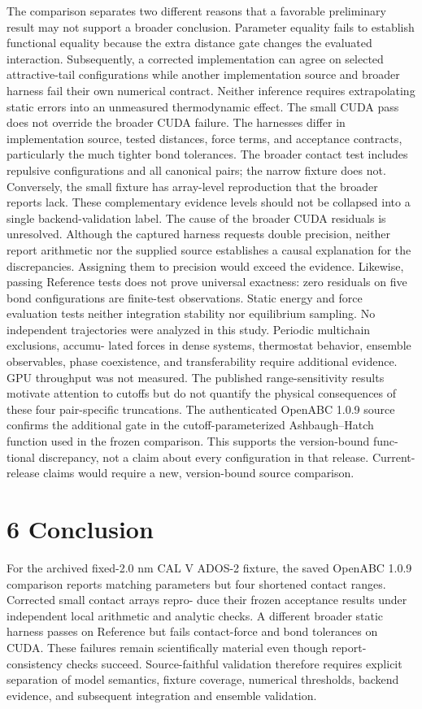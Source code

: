 \documentclass[11pt]{article}
\begin{document}
The comparison separates two different reasons that a favorable preliminary result may not support
a broader conclusion. Parameter equality fails to establish functional equality because the extra
distance gate changes the evaluated interaction. Subsequently, a corrected implementation can
agree on selected attractive-tail configurations while another implementation source and broader
harness fail their own numerical contract. Neither inference requires extrapolating static errors into
an unmeasured thermodynamic effect.
The small CUDA pass does not override the broader CUDA failure. The harnesses differ in
implementation source, tested distances, force terms, and acceptance contracts, particularly the
much tighter bond tolerances. The broader contact test includes repulsive configurations and
all canonical pairs; the narrow fixture does not. Conversely, the small fixture has array-level
reproduction that the broader reports lack. These complementary evidence levels should not be
collapsed into a single backend-validation label.
The cause of the broader CUDA residuals is unresolved. Although the captured harness requests
double precision, neither report arithmetic nor the supplied source establishes a causal explanation
for the discrepancies. Assigning them to precision would exceed the evidence. Likewise, passing
Reference tests does not prove universal exactness: zero residuals on five bond configurations are
finite-test observations.
Static energy and force evaluation tests neither integration stability nor equilibrium sampling.
No independent trajectories were analyzed in this study. Periodic multichain exclusions, accumu-
lated forces in dense systems, thermostat behavior, ensemble observables, phase coexistence, and
transferability require additional evidence. GPU throughput was not measured. The published
range-sensitivity results motivate attention to cutoffs but do not quantify the physical consequences
of these four pair-specific truncations.
The authenticated OpenABC 1.0.9 source confirms the additional gate in the cutoff-parameterized
Ashbaugh–Hatch function used in the frozen comparison. This supports the version-bound func-
tional discrepancy, not a claim about every configuration in that release. Current-release claims
would require a new, version-bound source comparison.

\section*{6 Conclusion}

For the archived fixed-2.0 nm CAL V ADOS-2 fixture, the saved OpenABC 1.0.9 comparison reports
matching parameters but four shortened contact ranges. Corrected small contact arrays repro-
duce their frozen acceptance results under independent local arithmetic and analytic checks. A
different broader static harness passes on Reference but fails contact-force and bond tolerances on
CUDA. These failures remain scientifically material even though report-consistency checks succeed.
Source-faithful validation therefore requires explicit separation of model semantics, fixture coverage,
numerical thresholds, backend evidence, and subsequent integration and ensemble validation.
\end{document}
